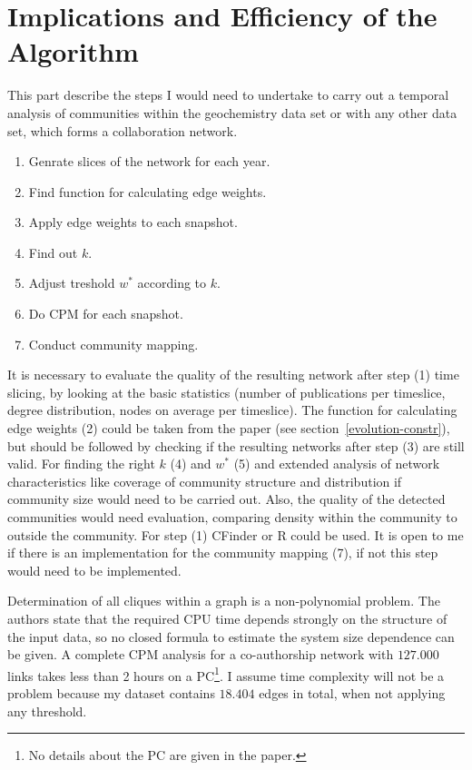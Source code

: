 \documentclass[runningheads,a4paper]{llncs}
\begin{document}
\section{Implications and Efficiency of the Algorithm}
This part describe the steps I would need to undertake to carry out a temporal analysis of communities within the geochemistry data set or with any other data set, which forms a collaboration network.

\medskip

\noindent
\colorbox{usethiscolorhere}{
\begin{minipage}{\dimexpr\textwidth-2\fboxsep}

\begin{enumerate}
\small
	\item[(1)] Genrate slices of the network for each year.
	\item[(2)] Find function for calculating edge weights.
	\item[(3)] Apply edge weights to each snapshot.
	\item[(4)] Find out $k$.
	\item[(5)] Adjust treshold $w^*$ according to $k$.	
	\item[(6)] Do CPM for each snapshot.
	\item[(7)] Conduct community mapping.
\end{enumerate}

\end{minipage}
}

\medskip

It is necessary to evaluate the quality of the resulting network after step (1) time slicing, by looking at the basic statistics (number of publications per timeslice, degree distribution, nodes on average per timeslice).
The function for calculating edge weights (2) could be taken from the paper (see section~\ref{evolution-constr}), but should be followed by checking if the resulting networks after step (3) are still valid.
For finding the right $k$ (4) and $w^*$ (5) and extended analysis of network characteristics like coverage of community structure and distribution if community size would need to be carried out.
Also, the quality of the detected communities would need evaluation, comparing density within the community to outside the community.
For step (1) CFinder or R could be used.
It is open to me if there is an implementation for the community mapping (7), if not this step would need to be implemented.

Determination of all cliques within a graph is a non-polynomial problem.
The authors state that the required CPU time depends strongly on the structure of the input data, so no closed formula to estimate the system size dependence can be given.
A complete CPM analysis for a co-authorship network with $127.000$ links takes less than 2 hours on a PC\footnote{No details about the PC are given in the paper.}.
I assume time complexity will not be a problem because my dataset contains $18.404$ edges in total, when not applying any threshold.
\end{document}
